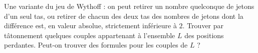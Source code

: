 Une variante du jeu de Wythoff : on peut retirer un nombre quelconque de jetons d'un seul tas, ou retirer de chacun des deux tas des nombres de jetons dont la différence est, en valeur absolue, strictement inférieure à $2$. Trouver par tâtonnement quelques couples appartenant à l'ensemble $L$ des positions perdantes. Peut-on trouver des formules pour les couples de $L$ ?
